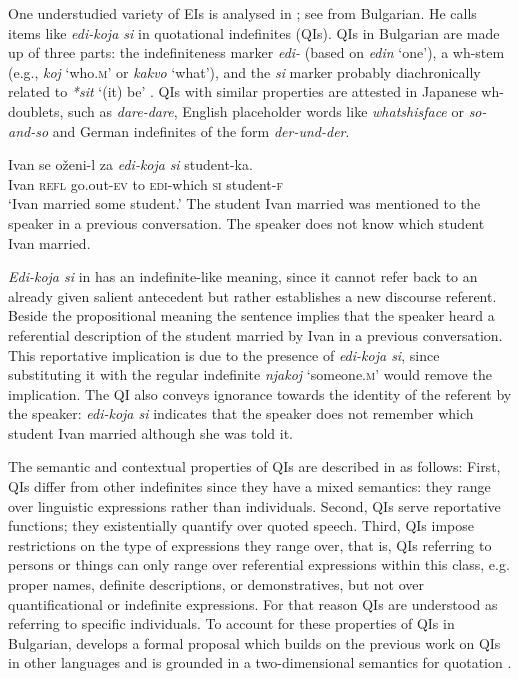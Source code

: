 \documentclass[output=paper,colorlinks,citecolor=brown]{langscibook}
\begin{document}
One understudied variety of EIs is analysed in \citet{Koev2017}; see  from Bulgarian. He calls items like \textit{edi-koja si} in  quotational indefinites (QIs). QIs in Bulgarian are made up of three parts: the indefiniteness marker \textit{edi-} (based on \textit{edin} ‘one’), a wh-stem (e.g., \textit{koj} ‘who.\textsc{m}’ or \textit{kakvo} ‘what’), and the \textit{si} marker probably diachronically related to \textit{*sit} ‘(it) be’ \citep[271]{Haspelmath1997}. QIs with similar properties are attested in Japanese wh-doublets, such as \textit{dare-dare}, English placeholder words like \textit{whatshisface} or \textit{so-and-so} and German indefinites of the form \textit{der-und-der}.

\ea\label{geist:ex:koev1}
\gll Ivan se oženi-l za \textit{edi-koja} \textit{si} student-ka.\\
Ivan \textsc{refl} go.out-\textsc{ev} to \textsc{edi}-which \textsc{si} student-\textsc{f}\\
\glt ‘Ivan married some student.’
\ea The student Ivan married was mentioned to the speaker in a previous conversation.
\ex The speaker does not know which student Ivan married.\\\hfill\citep[393]{Koev2017}
\z\z

\noindent \textit{Edi-koja si} in  has an indefinite-like meaning, since it cannot refer back to an already given salient antecedent but rather establishes a new discourse referent. Beside the propositional meaning the sentence implies that the speaker heard a referential description of the student married by Ivan in a previous conversation. This reportative implication is due to the presence of \textit{edi-koja si}, since substituting it with the regular indefinite \textit{njakoj} ‘someone.\textsc{m}’ would remove the implication. The QI also conveys ignorance towards the identity of the referent by the speaker: \textit{edi-koja si} indicates that the speaker does not remember which student Ivan married although she was told it.

The semantic and contextual properties of QIs are described in \citet{Koev2017} as follows: First, QIs differ from other indefinites since they have a mixed semantics: they range over linguistic expressions rather than individuals. Second, QIs serve reportative functions; they existentially quantify over quoted speech. Third, QIs impose restrictions on the type of expressions they range over, that is, QIs referring to persons or things can only range over referential expressions within this class, e.g. proper names, definite descriptions, or demonstratives, but not over quantificational or indefinite expressions. For that reason QIs are understood as referring to specific individuals. To account for these properties of QIs in Bulgarian, \citeauthor{Koev2017} develops a formal proposal which builds on the previous work on QIs in other languages and is grounded in a two-dimensional semantics for quotation \citep{Potts2005}.
\end{document}
